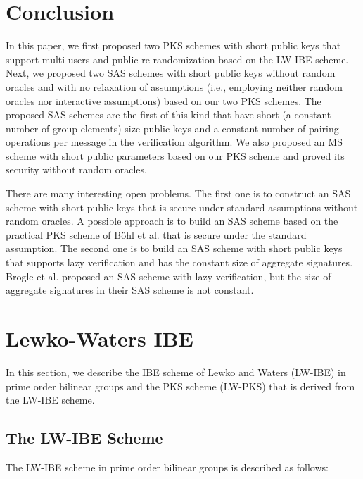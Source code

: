 \documentclass[11pt,letterpaper]{article}
\begin{document}
\section{Conclusion}

In this paper, we first proposed two PKS schemes with short public keys that
support multi-users and public re-randomization based on the LW-IBE scheme.
Next, we proposed two SAS schemes with short public keys without random
oracles and with no relaxation of assumptions (i.e., employing neither random
oracles nor interactive assumptions) based on our two PKS schemes. The
proposed SAS schemes are the first of this kind that have short (a constant
number of group elements) size public keys and a constant number of pairing
operations per message in the verification algorithm. We also proposed an MS
scheme with short public parameters based on our PKS scheme and proved its
security without random oracles.

There are many interesting open problems. The first one is to construct an
SAS scheme with short public keys that is secure under standard assumptions
without random oracles. A possible approach is to build an SAS scheme based
on the practical PKS scheme of B{\"{o}}hl et al. \cite{BohlHJKSS13} that is
secure under the standard assumption. The second one is to build an SAS
scheme with short public keys that supports lazy verification and has the
constant size of aggregate signatures. Brogle et al. \cite{BrogleGR12}
proposed an SAS scheme with lazy verification, but the size of aggregate
signatures in their SAS scheme is not constant.





\appendix

\section{Lewko-Waters IBE} \label{sec:lw-ibe}

In this section, we describe the IBE scheme of Lewko and Waters (LW-IBE)
\cite{LewkoW10} in prime order bilinear groups and the PKS scheme (LW-PKS)
that is derived from the LW-IBE scheme.

\subsection{The LW-IBE Scheme}

The LW-IBE scheme in prime order bilinear groups is described as follows:
\end{document}
